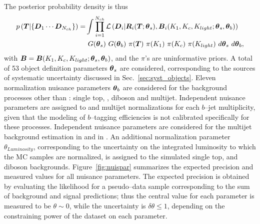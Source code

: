 \documentclass[a4paper]{article}
\begin{document}
The posterior probability density is thus
\begin{equation}
\begin{split}
p\left(\boldsymbol{T}{}|\{\boldsymbol{D}{}_1\cdots{}\boldsymbol{D}{}_{N_{ch}}\}\right)=&
\int
\prod_{i=1}^{N_{ch}}\mathcal{L}\left(\boldsymbol{D}{}_i|\boldsymbol{R}{}_i(\boldsymbol{T}{};\boldsymbol{\theta{}}{}_s),\boldsymbol{B}{}_i(K_{1},K_c,K_{light};\boldsymbol{\theta{}}{}_s,\boldsymbol{\theta{}}{}_b)\right)\\
& ~G(\boldsymbol{\theta{}}{}_s)
~G(\boldsymbol{\theta{}}{}_b)
~\pi{}(\boldsymbol{T}{})
~\pi{}(K_{1})
~\pi{}(K_c)
~\pi{}(K_{light})
~d\boldsymbol{\theta{}}{}_s
~d\boldsymbol{\theta{}}{}_b,\\
\end{split}
\end{equation}
with
$\boldsymbol{B}{}=\boldsymbol{B}{}(K_{1},K_c,K_{light};\boldsymbol{\theta{}}_s,\boldsymbol{\theta{}}{}_b)$,
and the $\pi{}$'s are uninformative priors.
A total of 53 object definition parameters $\boldsymbol{\theta{}}_s$ are
considered, corresponding to the sources of systematic uncertainty
discussed in Sec.~\ref{sec:syst_objects}.
Eleven normalization nuisance parameters $\boldsymbol{\theta{}}_b$ are considered
for the background processes other than \wjets{}: single top, \zjets{}, diboson 
and multijet. Independent nuisance parameters are assigned to \zjets{}
and multijet normalizations for each $b$--jet multiplicity, given that
the modeling of $b$--tagging efficiencies is not calibrated
specifically for these processes. Independent nuisance parameters are
considered for the multijet background estimation in \mujets{} and in
\ejets{}. An additional normalization parameter $\theta_{Luminosity}$,
corresponding to the uncertainty on the integrated luminosity to which
the MC samples are normalized, is assigned to the simulated single
top, \zjets{} and diboson backgrounds.
Figure~\ref{fig:nuispar} summarizes the expected precision and measured
values for all nuisance parameters. The expected precision is obtained
by evaluating the likelihood for a pseudo--data sample corresponding
to the sum of background and signal predictions; thus the central
value for each parameter is measured to be $\theta\sim0$, while the
uncertainty is $\delta\theta\leq1$, depending on the constraining power of
the dataset on each parameter.
\end{document}
